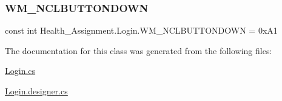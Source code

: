 \subsubsection{\texorpdfstring{W\+M\+\_\+\+N\+C\+L\+B\+U\+T\+T\+O\+N\+D\+O\+WN}{WM\_NCLBUTTONDOWN}}
{\footnotesize\ttfamily const int Health\+\_\+\+Assignment.\+Login.\+W\+M\+\_\+\+N\+C\+L\+B\+U\+T\+T\+O\+N\+D\+O\+WN = 0x\+A1}



The documentation for this class was generated from the following files\+:\begin{DoxyCompactItemize}
\item 
\hyperlink{_login_8cs}{Login.\+cs}\item 
\hyperlink{_login_8designer_8cs}{Login.\+designer.\+cs}\end{DoxyCompactItemize}
